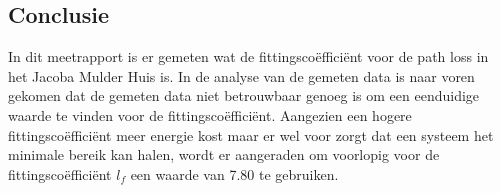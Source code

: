 \subsection{Conclusie}
In dit meetrapport is er gemeten wat de fittingscoëfficiënt voor de path loss in het Jacoba Mulder Huis is. In de analyse van de gemeten data is naar voren gekomen dat de gemeten data niet betrouwbaar genoeg is om een eenduidige waarde te vinden voor de fittingscoëfficiënt. Aangezien een hogere fittingscoëfficiënt meer energie kost maar er wel voor zorgt dat een systeem het minimale bereik kan halen, wordt er aangeraden om voorlopig voor de fittingscoëfficiënt $l_f$ een waarde van 7.80 te gebruiken. 
